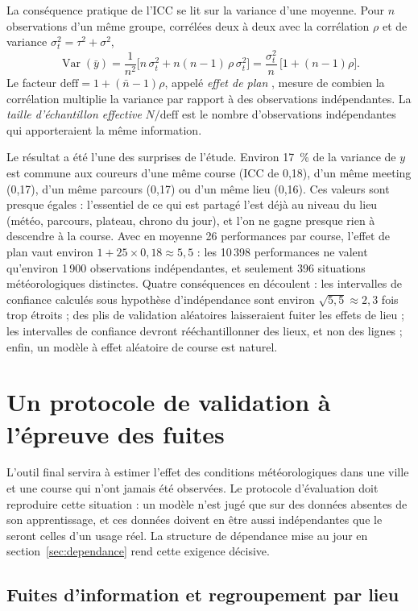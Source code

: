 \documentclass[11pt,a4paper]{article}
\DeclareMathOperator{\Var}{Var}
\begin{document}
La conséquence pratique de l'ICC se lit sur la variance d'une moyenne. Pour $n$ observations d'un même groupe,
corrélées deux à deux avec la corrélation $\rho$ et de variance $\sigma_t^2 = \tau^2 + \sigma^2$,
\[
\Var(\bar y) = \frac{1}{n^2}\Big[n\,\sigma_t^2 + n(n-1)\,\rho\,\sigma_t^2\Big] = \frac{\sigma_t^2}{n}\,
\big[1 + (n - 1)\rho\big].
\]
Le facteur $\mathrm{deff} = 1 + (\bar n - 1)\rho$, appelé \emph{effet de plan} \citep{kish1965}, mesure de combien la
corrélation multiplie la variance par rapport à des observations indépendantes. La \emph{taille d'échantillon
effective} $N/\mathrm{deff}$ est le nombre d'observations indépendantes qui apporteraient la même information.

Le résultat a été l'une des surprises de l'étude. Environ 17~\% de la variance de $y$ est commune aux coureurs d'une
même course (ICC de 0,18), d'un même meeting (0,17), d'un même parcours (0,17) ou d'un même lieu (0,16). Ces valeurs
sont presque égales : l'essentiel de ce qui est partagé l'est déjà au niveau du lieu (météo, parcours, plateau, chrono
du jour), et l'on ne gagne presque rien à descendre à la course. Avec en moyenne 26 performances par course, l'effet de
plan vaut environ $1 + 25 \times 0{,}18 \approx 5{,}5$ : les 10\,398 performances ne valent qu'environ 1\,900
observations indépendantes, et seulement 396 situations météorologiques distinctes. Quatre conséquences en découlent :
les intervalles de confiance calculés sous hypothèse d'indépendance sont environ $\sqrt{5{,}5} \approx 2{,}3$ fois trop
étroits ; des plis de validation aléatoires laisseraient fuiter les effets de lieu ; les intervalles de confiance
devront rééchantillonner des lieux, et non des lignes ; enfin, un modèle à effet aléatoire de course est naturel.

\section{Un protocole de validation à l'épreuve des fuites}\label{sec:validation}

L'outil final servira à estimer l'effet des conditions météorologiques dans une ville et une course qui n'ont jamais
été observées. Le protocole d'évaluation doit reproduire cette situation : un modèle n'est jugé que sur des données
absentes de son apprentissage, et ces données doivent en être aussi indépendantes que le seront celles d'un usage réel.
La structure de dépendance mise au jour en section~\ref{sec:dependance} rend cette exigence décisive.

\subsection{Fuites d'information et regroupement par lieu}\label{sec:fuites}
\end{document}
